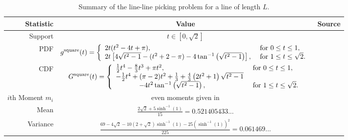 \begin{table}[ht]
  \centering
  \begin{tabular}{|r|c|l|}
    \hline
    Statistic & Value & Source \\ 
    \hline
      Support            & $t \in [0, \sqrt{2}]$ & \\
      PDF                & $\displaystyle 
  g^{\rm square}(t) = \left\{ \begin{array}{ll}
      2t (t^2-4t+\pi),
               & \mbox{ for } 0 \leq t \leq 1, \\
      2t \left[4 \sqrt{t^2-1} - (t^2+2-\pi) - 4 \tan^{-1} \left(\sqrt{t^2-1} \right)\right], 
               & \mbox{ for } 1 \leq t \leq \sqrt{2} . \\ 
    \end{array} \right.
                                 $ &
                             \cite{philip:_probab_distr_distan_between_two,weisstein:_squar_line_picking} \\
      CDF                & $\displaystyle
  G^{\rm square}(t) = \left\{ \begin{array}{ll}
      \frac{1}{2} t^4 - \frac{8}{3} t^3 + \pi t^2, 
               & \mbox{ for } 0 \leq t \leq 1, \\
      -\frac{1}{2} t^4 + (\pi-2)t^2 + \frac{1}{3}
                   +\frac{4}{3} \left( 2t^2+1 \right)\sqrt{t^2-1} 
                     & \\
                   \hspace{12mm} - 4 t^2 \tan^{-1} \left(\sqrt{t^2-1} \right),
               & \mbox{ for } 1 \leq t \leq \sqrt{2} . \\ 
    \end{array} \right.
                                 $ & 
                             \cite{weisstein:_squar_line_picking} \\
      $i$th Moment $m_i$ & even moments given in\cite{weisstein:_squar_line_picking} &
                              \cite{weisstein:_squar_line_picking} \\
      Mean               & $\displaystyle \frac{2 \sqrt{2} + 5\sinh^{-1}(1)}{15}
                             = 0.521405433...$ &
                             \cite{weisstein:_squar_line_picking} \\[1.5ex]
      Variance           & $\displaystyle \frac{69 - 4\sqrt{2} -
                             10(2+\sqrt{2}) \sinh^{-1}(1)
                             -25(\sinh^{-1}(1) )^2
                            }{225}
                             = 0.061469...$ &
                             \cite{weisstein:_squar_line_picking} \\[1.5ex]
    \hline
  \end{tabular}
  \caption{Summary of the line-line picking problem for a line of
    length $L$.}
  \label{tab:summary_line}
\end{table}

